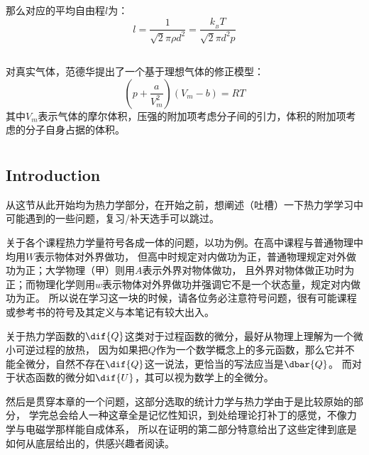             那么对应的平均自由程$l$为：
            \begin{equation}
                l =  \frac{1}{\sqrt{2}\pi \rho d^{2}} = \frac{k_{_B}T}{\sqrt{2}\pi d^{2}p}
                \nonumber
            \end{equation}
        \subsection[范德华状态方程]{}
            对真实气体，范德华提出了一个基于理想气体的修正模型：
            \begin{equation}
                (p+\frac{a}{V_{m}^{2}})(V_{m}-b)=RT
                \nonumber
            \end{equation}
            其中$V_m$表示气体的摩尔体积，压强的附加项考虑分子间的引力，体积的附加项考虑的分子自身占据的体积。
    \section[热力学第零定律]{}
        \subsection[引言]{Introduction}
            从这节从此开始均为热力学部分，在开始之前，想阐述（吐槽）一下热力学学习中可能遇到的一些问题，复习/补天选手可以跳过。
           
            关于各个课程热力学量符号各成一体的问题，以功为例。在高中课程与普通物理中均用$W$表示物体对外界做功，
            但高中时规定对内做功为正，普通物理规定对外做功为正；大学物理（甲）则用$A$表示外界对物体做功，
            且外界对物体做正功时为正；而物理化学则用$w$表示物体对外界做功并强调它不是一个状态量，规定对内做功为正。
            所以说在学习这一块的时候，请各位务必注意符号问题，很有可能课程或参考书的符号及其定义与本笔记有较大出入。

            关于热力学函数的$\dif{Q}$这类对于过程函数的微分，最好从物理上理解为一个微小可逆过程的放热，
            因为如果把$Q$作为一个数学概念上的多元函数，那么它并不能全微分，自然不存在$\dif{Q}$这一说法，更恰当的写法应当是$\dbar{Q}$。
            而对于状态函数的微分如$\dif{U}$，其可以视为数学上的全微分。

            然后是贯穿本章的一个问题，这部分选取的统计力学与热力学由于是比较原始的部分，
            学完总会给人一种这章全是记忆性知识，到处给理论打补丁的感觉，不像力学与电磁学那样能自成体系，
            所以在证明的第二部分特意给出了这些定律到底是如何从底层给出的，供感兴趣者阅读。

